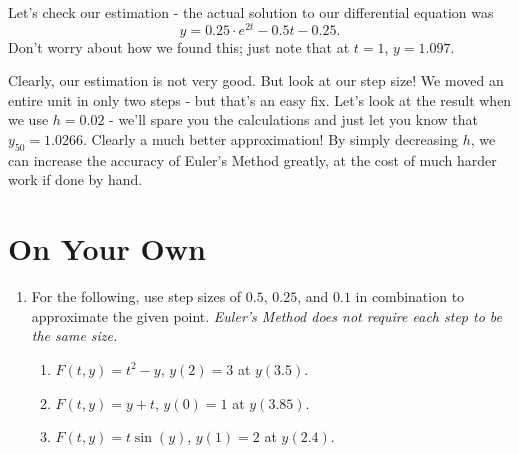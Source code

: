 \documentclass{ximera}
\begin{document}
Let's check our estimation - the actual solution to our differential equation was $$y = 0.25\cdot e^{2t}-0.5t-0.25\text{.}$$ Don't worry about how we found this; just note that at $t=1$, $y = 1.097$.

Clearly, our estimation is not very good. But look at our step size! We moved an entire unit in only two steps - but that's an easy fix. Let's look at the result when we use $h = 0.02$ - we'll spare you the calculations and just let you know that $y_{50}=1.0266$. Clearly a much better approximation! By simply decreasing $h$, we can increase the accuracy of Euler's Method greatly, at the cost of much harder work if done by hand.

\section{On Your Own}

\begin{enumerate}
\item For the following, use step sizes of $0.5$, $0.25$, and $0.1$ in combination to approximate the given point. \textit{Euler's Method does not require each step to be the same size.}
\begin{enumerate}
\item $F(t,y) = t^2 -y$, $y(2) = 3$ at $y(3.5)$.
\item $F(t,y) = y+t$, $y(0)=1$ at $y(3.85)$.
\item $F(t,y) = t\sin(y)$, $y(1) = 2$ at $y(2.4)$.
\end{enumerate}
\end{enumerate}
\end{document}
